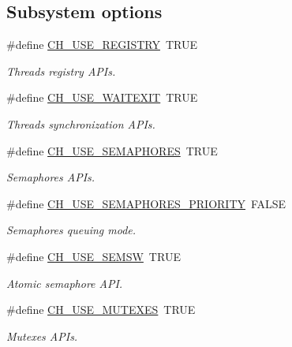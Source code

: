 \subsection*{Subsystem options}
\begin{DoxyCompactItemize}
\item 
\#define \hyperlink{group__config_ga881045654c5c0b04081bf89da3fe4534}{C\+H\+\_\+\+U\+S\+E\+\_\+\+R\+E\+G\+I\+S\+T\+R\+Y}~T\+R\+U\+E
\begin{DoxyCompactList}\small\item\em Threads registry A\+P\+Is. \end{DoxyCompactList}\item 
\#define \hyperlink{group__config_gac5e6308f66b8fdb57f0c849ed22b3d95}{C\+H\+\_\+\+U\+S\+E\+\_\+\+W\+A\+I\+T\+E\+X\+I\+T}~T\+R\+U\+E
\begin{DoxyCompactList}\small\item\em Threads synchronization A\+P\+Is. \end{DoxyCompactList}\item 
\#define \hyperlink{group__config_gab88f410fdc6a67192194a8431d991b27}{C\+H\+\_\+\+U\+S\+E\+\_\+\+S\+E\+M\+A\+P\+H\+O\+R\+E\+S}~T\+R\+U\+E
\begin{DoxyCompactList}\small\item\em Semaphores A\+P\+Is. \end{DoxyCompactList}\item 
\#define \hyperlink{group__config_ga866568c0387963f11c078a8d939c2284}{C\+H\+\_\+\+U\+S\+E\+\_\+\+S\+E\+M\+A\+P\+H\+O\+R\+E\+S\+\_\+\+P\+R\+I\+O\+R\+I\+T\+Y}~F\+A\+L\+S\+E
\begin{DoxyCompactList}\small\item\em Semaphores queuing mode. \end{DoxyCompactList}\item 
\#define \hyperlink{group__config_gae9e6ff0fe1964761ea6e1bce51d8ee59}{C\+H\+\_\+\+U\+S\+E\+\_\+\+S\+E\+M\+S\+W}~T\+R\+U\+E
\begin{DoxyCompactList}\small\item\em Atomic semaphore A\+P\+I. \end{DoxyCompactList}\item 
\#define \hyperlink{group__config_ga4f461a7b5edbff2405b7b40d2bb238a6}{C\+H\+\_\+\+U\+S\+E\+\_\+\+M\+U\+T\+E\+X\+E\+S}~T\+R\+U\+E
\begin{DoxyCompactList}\small\item\em Mutexes A\+P\+Is. \end{DoxyCompactList}\item 

\end{DoxyCompactItemize}
